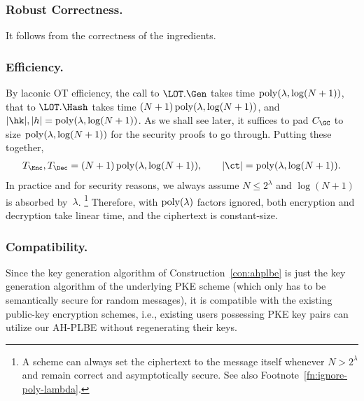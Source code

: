 \subsubsection{Robust Correctness.}
It follows from the correctness of the ingredients.

\subsubsection{Efficiency.}
By laconic OT efficiency,
the call to
$\LOT.\Gen$ takes time ${\operatorname{poly}(\lambda,\log(N+1))}$,
that to
$\LOT.\Hash$ takes time ${(N+1)\operatorname{poly}(\lambda,\log(N+1))}$, and
${|\hk|,|h|=\poly(\lambda,\log(N+1))}$.
As we shall see later, it suffices to pad $C_\GC$ to size ${\operatorname{poly}(\lambda,\log(N+1))}$ for the security proofs to go through.
Putting these together,
\begin{align*}
T_\Enc,T_\Dec
=
(N+1)\poly(\lambda,\log(N+1)),
\qquad
|\ct|
=
\poly(\lambda,\log(N+1)).
\end{align*}
In practice and for security reasons,
we always assume ${N\leq 2^\lambda}$ and ${\log(N+1)}$ is absorbed by~$\lambda$.%
\footnote{%
A scheme can always set the ciphertext to the message itself
whenever ${N>2^\lambda}$ and
remain correct and asymptotically secure.
See also Footnote~\ref{fn:ignore-poly-lambda}.}
Therefore, with $\operatorname{poly}(\lambda)$ factors ignored,
both encryption and decryption take linear time,
and the ciphertext is constant-size.

\subsubsection{Compatibility.}
Since the key generation algorithm of Construction~\ref{con:ahplbe} is just the key generation algorithm of the underlying PKE scheme (which only has to be semantically secure for random messages),
it is compatible with the existing public-key encryption schemes,
i.e., existing users possessing PKE key pairs can utilize our AH-PLBE without regenerating their keys.
